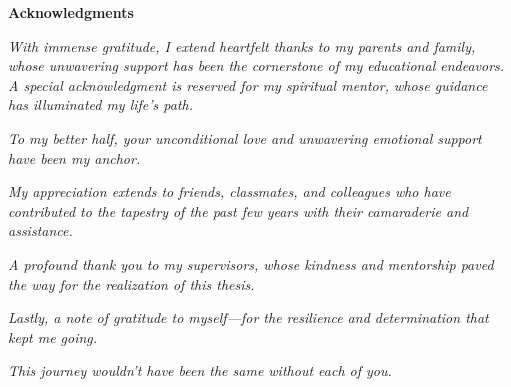 \thispagestyle{empty}

\begin{center}
  {\bf \Huge Acknowledgments}
\end{center}

\vspace{4cm}

\noindent
\emph{With immense gratitude, I extend heartfelt thanks to my parents and family, whose unwavering support has been the cornerstone of my educational endeavors. A special acknowledgment is reserved for my spiritual mentor, whose guidance has illuminated my life's path.}

\noindent
\emph{To my better half, your unconditional love and unwavering emotional support have been my anchor.}

\vspace{\baselineskip}

\noindent
\emph{My appreciation extends to friends, classmates, and colleagues who have contributed to the tapestry of the past few years with their camaraderie and assistance.}

\vspace{\baselineskip}

\noindent
\emph{A profound thank you to my supervisors, whose kindness and mentorship paved the way for the realization of this thesis.}

\vspace{\baselineskip}

\noindent
\emph{Lastly, a note of gratitude to myself—for the resilience and determination that kept me going.}

\vspace{\baselineskip}

\noindent
    \emph{This journey wouldn't have been the same without each of you.}
